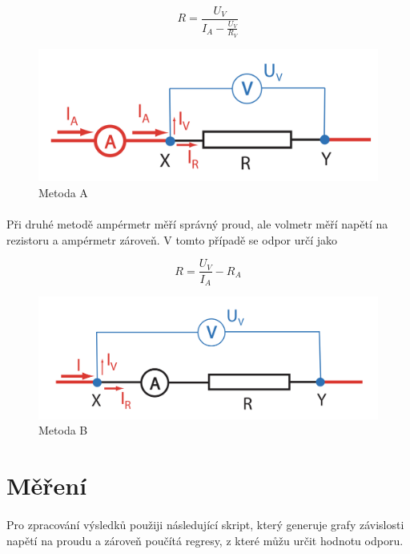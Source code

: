 \documentclass[a4paper,11pt]{article}
\begin{document}
    \begin{equation}
        R = \frac{U_{V}}{I_{A} - \frac{U_{V}}{R_{V}}}
    \end{equation}

    \begin{figure}[H]
        \centering
        \includegraphics[width=0.6\linewidth]{metoda_A.png}
        \caption{Metoda A}
    \end{figure}

    \paragraph{} Při druhé metodě ampérmetr měří správný proud, ale volmetr 
    měří napětí na rezistoru a ampérmetr zároveň. V tomto případě se odpor 
    určí jako

    \begin{equation}
        R = \frac{U_{V}}{I_{A}} - R_{A}
    \end{equation}

    \begin{figure}[H]
        \centering
        \includegraphics[width=0.6\linewidth]{metoda_B.png}
        \caption{Metoda B}
    \end{figure}

\section{Měření}

    \paragraph{} Pro zpracování výsledků použiji následující skript, který
    generuje grafy závislosti napětí na proudu a zároveň poučítá regresy, z
    které můžu určit hodnotu odporu.
\end{document}
